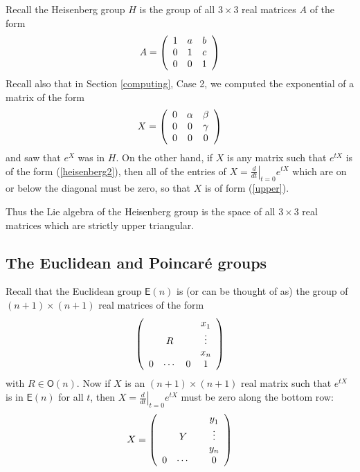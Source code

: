 \documentclass{amsbook}
\theoremstyle{plain}
\numberwithin{equation}{chapter}
\numberwithin{theorem}{chapter}
\begin{document}
Recall the Heisenberg group $H$ is the group of all $3\times3$ real matrices
$A$ of the form
\begin{equation}
A=\left(
\begin{array}
[c]{ccc}%
1 & a & b\\
0 & 1 & c\\
0 & 0 & 1
\end{array}
\right)  \label{heisenberg2}%
\end{equation}
Recall also that in Section \ref{computing}, Case 2, we computed the
exponential of a matrix of the form
\begin{equation}
X=\left(
\begin{array}
[c]{ccc}%
0 & \alpha & \beta\\
0 & 0 & \gamma\\
0 & 0 & 0
\end{array}
\right)  \label{upper}%
\end{equation}
and saw that $e^{X}$ was in $H$. On the other hand, if $X$ is any matrix such
that $e^{tX}$ is of the form (\ref{heisenberg2}), then all of the entries of
$X=\left.  \tfrac{d}{dt}\right|  _{t=0}e^{tX}$ which are on or below the
diagonal must be zero, so that $X$ is of form (\ref{upper}).

Thus the Lie algebra of the Heisenberg group is the space of all $3\times3$
real matrices which are strictly upper triangular.

\subsection{The Euclidean and Poincar\'{e} groups}

Recall that the Euclidean group $\mathsf{E}(n)$ is (or can be thought of as)
the group of $(n+1)\times(n+1)$ real matrices of the form
\[
\left(
\begin{array}
[c]{cccc}%
&  &  & x_{1}^{{}}\\
& R &  & \vdots\\
&  &  &  x_{n}\\
0 & \cdots & 0 & 1
\end{array}
\right)
\]
with $R\in\mathsf{O}(n)$. Now if $X$ is an $(n+1)\times(n+1)$ real matrix such
that $e^{tX}$ is in $\mathsf{E}(n)$ for all $t$, then $X=\left.  \frac{d}%
{dt}\right|  _{t=0}e^{tX}$ must be zero along the bottom row:
\begin{equation}
X=\left(
\begin{array}
[c]{cccc}%
&  &  & y_{1}^{{}}\\
& Y &  & \vdots\\
&  &  &  y_{n}\\
0 & \cdots &  & 0
\end{array}
\right) \label{euclid.al}%
\end{equation}
\end{document}
